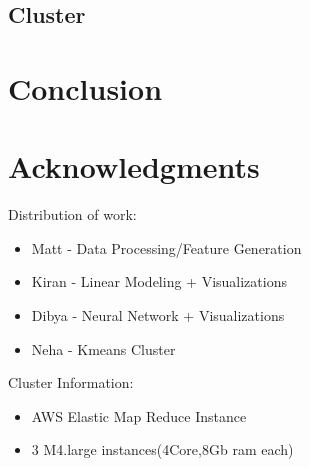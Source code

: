 \documentclass[11pt,letterpaper]{article}
\begin{document}
\subsection{Cluster}
\label{ssec:clusterResult}

\section{Conclusion}

\section*{Acknowledgments}
Distribution of work:
\begin{itemize}
	\item {Matt - Data Processing/Feature Generation}
	\item {Kiran - Linear Modeling + Visualizations}
	\item {Dibya - Neural Network + Visualizations}
	\item {Neha - Kmeans Cluster}
\end{itemize}

Cluster Information:
\begin{itemize}
	\item{AWS Elastic Map Reduce Instance}
	\item{3 M4.large instances(4Core,8Gb ram each)}
\end{itemize}



\end{document}
